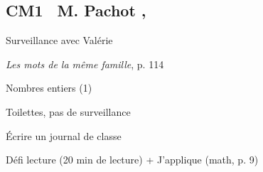 \documentclass{article}
\begin{document}
\reversemarginpar

		
\subsection*{CM1 \ M. Pachot \qquad {} \sep}
\aam Surveillance avec Valérie

\ort\ham \textit{Les mots de la même famille}, p. 114

\nec\han Nombres entiers (1)

\ram Toilettes, pas de surveillance

\ppd\amr Écrire un journal de classe




\dev Défi lecture (20 min de lecture)  + J’applique (math, p. 9)

\fmm
\end{document}

